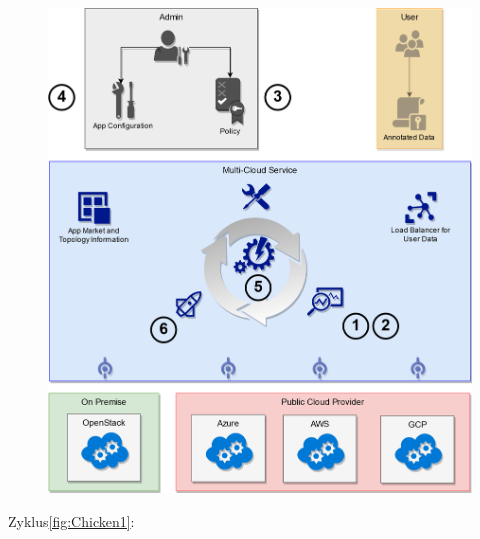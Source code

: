 \begin{figure}
	\centering
	\includegraphics[width=0.9\linewidth]{images/cycle}
	\caption{}
	\label{fig:Chicken1}
\end{figure}

Zyklus\autoref{fig:Chicken1}:


